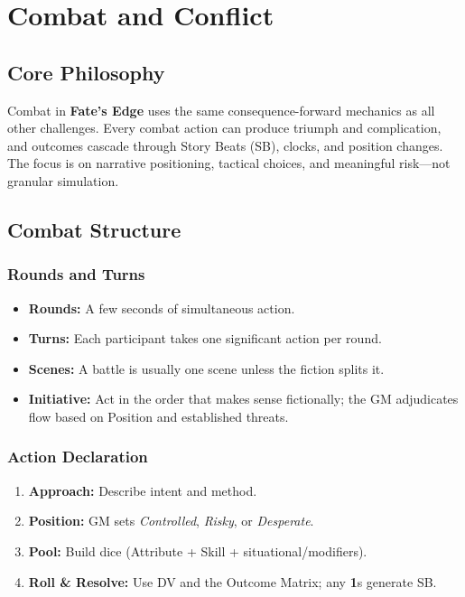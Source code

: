\chapter{Combat and Conflict}
\label{chap:combat-conflict}

\section{Core Philosophy}
\label{sec:combat-philosophy}

Combat in \textbf{Fate's Edge} uses the same consequence-forward mechanics as all other challenges. Every combat action can produce triumph and complication, and outcomes cascade through Story Beats (SB), clocks, and position changes. The focus is on narrative positioning, tactical choices, and meaningful risk—not granular simulation.

\section{Combat Structure}
\label{sec:combat-structure}

\subsection{Rounds and Turns}
\label{subsec:rounds-turns}

\begin{itemize}
  \item \textbf{Rounds:} A few seconds of simultaneous action.
  \item \textbf{Turns:} Each participant takes one significant action per round.
  \item \textbf{Scenes:} A battle is usually one scene unless the fiction splits it.
  \item \textbf{Initiative:} Act in the order that makes sense fictionally; the GM adjudicates flow based on Position and established threats. 
\end{itemize}

\subsection{Action Declaration}
\label{subsec:action-declaration}

\begin{enumerate}
  \item \textbf{Approach:} Describe intent and method.
  \item \textbf{Position:} GM sets \textit{Controlled}, \textit{Risky}, or \textit{Desperate}. 
  \item \textbf{Pool:} Build dice (Attribute + Skill + situational/modifiers).
  \item \textbf{Roll \& Resolve:} Use DV and the Outcome Matrix; any \textbf{1}s generate SB. 
\end{enumerate}

